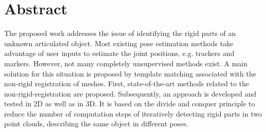 \chapter{Abstract}

The proposed work addresses the issue of identifying the rigid parts of an unknown articulated object. Most existing pose estimation methods take advantage of user inputs to estimate the joint positions, e.g. trackers and markers. However, not many completely unsupervised methods exist. A main solution for this situation is proposed by template matching associated with the non-rigid registration of meshes. First, state-of-the-art methods related to the non-rigid-registration are proposed.  Subsequently, an approach is developed and tested in 2D as well as in 3D. It is based on the divide and conquer principle to reduce the number of computation steps of iteratively detecting rigid parts in two point clouds, describing the same object in different poses.
